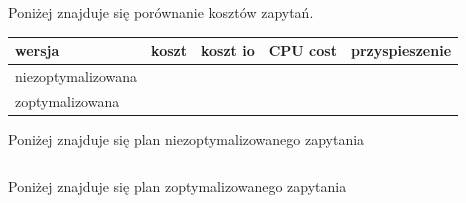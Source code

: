 \documentclass[11pt]{article}
\numberwithin{figure}{subsection}
\begin{document}
		\begin{lstlisting}[caption={Wywołanie zapytań}, captionpos=b]
		\end{lstlisting}
		
		Poniżej znajduje się porównanie kosztów zapytań.
		
		\begin{tabularx}{\textwidth}{|X|X|X|X|X|}
			\hline
			wersja & koszt & koszt io & CPU cost & przyspieszenie \\
			\hline
			niezoptymalizowana &  &  &  &  \\
			\hline
			zoptymalizowana &  &  &  &  \\
			\hline
		\end{tabularx}
		
		Poniżej znajduje się plan niezoptymalizowanego zapytania \\
		
		\begin{tabularx}{\textwidth}{|X|X|X|X|X|X|}
		\end{tabularx}
		
		Poniżej znajduje się plan zoptymalizowanego zapytania \\
		
		\begin{tabularx}{\textwidth}{|X|X|X|X|X|X|}
		\end{tabularx}
		

		
		
		
		
		
		
		

\newpage
\printbibliography
\end{document}
